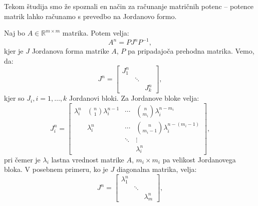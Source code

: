 \documentclass[mat1]{fmfdelo}
\begin{document}
Tekom študija smo že spoznali en način za računanje matričnih potenc -- potence matrik lahko računamo s prevedbo na Jordanovo formo.

Naj bo $A \in \mathbb{R}^{m\times m}$ matrika. Potem velja:
\begin{equation*}
    A^n = PJ^nP^{-1},
\end{equation*}
kjer je $J$ Jordanova forma matrike $A$, $P$ pa pripadajoča prehodna matrika. Vemo, da:
\begin{equation*}
    J^n = 
    \begin{bmatrix}
        J_1^n & & \\
         & \ddots & \\
         & & J_k^n
    \end{bmatrix},
\end{equation*}
kjer so $J_i, i=1,\ldots,k$ Jordanovi bloki. Za Jordanove bloke velja:
\begin{equation*}
    J_i^n = 
    \begin{bmatrix}
        \lambda_i^n & {n \choose 1}\lambda_i^{n-1} & \cdots & {n \choose m_i} \lambda_i^{n-m_i} \\
         & \lambda_i^n & \cdots  & {n \choose m_i-1} \lambda_i^{n-(m_i-1)} \\
         & & \ddots  & \vdots \\
         & & & \lambda_i^n
    \end{bmatrix},
\end{equation*}
pri čemer je $\lambda_i$ lastna vrednost matrike $A$, $m_i \times m_i$ pa velikost Jordanovega bloka.
V posebnem primeru, ko je $J$ diagonalna matrika, velja:
\begin{equation*}
    J^n = 
    \begin{bmatrix}
        \lambda_1^n & & \\
         & \ddots & \\
         & & \lambda_m^n
    \end{bmatrix},
\end{equation*}
\end{document}
